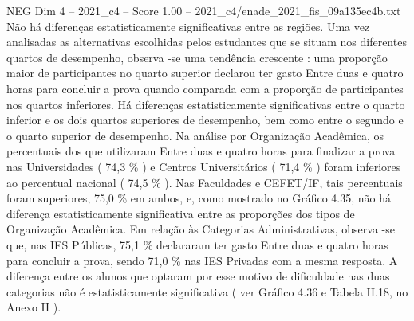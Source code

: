 \begin{textsample}{NEG Dim 4 – 2021\_c4 – Score 1.00 – 2021\_c4/enade\_2021\_fis\_09a135ec4b.txt}
Não há diferenças estatisticamente significativas entre as regiões.
Uma vez analisadas as alternativas escolhidas pelos estudantes que se situam nos diferentes quartos de desempenho, observa -se uma tendência crescente : uma proporção maior de participantes no quarto superior declarou ter gasto Entre duas e quatro horas para concluir a prova quando comparada com a proporção de participantes nos quartos inferiores.
Há diferenças estatisticamente significativas entre o quarto inferior e os dois quartos superiores de desempenho, bem como entre o segundo e o quarto superior de desempenho.
Na análise por Organização Acadêmica, os percentuais dos que utilizaram Entre duas e quatro horas para finalizar a prova nas Universidades ( 74,3 \% ) e Centros Universitários ( 71,4 \% ) foram inferiores ao percentual nacional ( 74,5 \% ).
Nas Faculdades e CEFET/IF, tais percentuais foram superiores, 75,0 \% em ambos, e, como mostrado no Gráfico 4.35, não há diferença estatisticamente significativa entre as proporções dos tipos de Organização Acadêmica.
Em relação às Categorias Administrativas, observa -se que, nas IES Públicas, 75,1 \% declararam ter gasto Entre duas e quatro horas para concluir a prova, sendo 71,0 \% nas IES Privadas com a mesma resposta.
A diferença entre os alunos que optaram por esse motivo de dificuldade nas duas categorias não é estatisticamente significativa ( ver Gráfico 4.36 e Tabela II.18, no Anexo II ).

\end{textsample}
